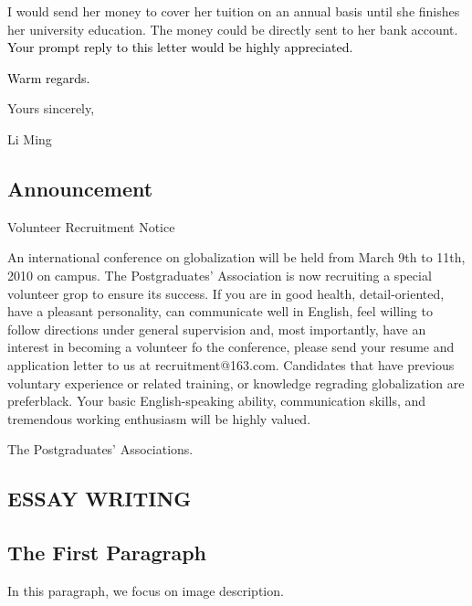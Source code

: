 \documentclass{article}
\makeatletter
\newcommand{\Rmnum}[1]{\expandafter\@slowromancap\romannumeral #1@}
\makeatother
\begin{document}
\par I would send her money to cover her tuition on an annual basis until she finishes her
university education. The money could be directly sent to her bank
account. \textcolor{black}{Your prompt reply to this letter would be highly appreciated.}

\par \textcolor{black}{Warm regards.}

\hfill Yours sincerely,

\hfill Li Ming

\subsection{Announcement}
\label{sec:letter}

\centerline{Volunteer Recruitment Notice}

\hspace{0.4cm} An international conference on globalization will be held from March 9th to 11th,
2010 on campus. The Postgraduates' Association is now recruiting a special volunteer grop
to ensure its success. If you are in good health, detail-oriented, have a pleasant
personality, can communicate well in English, feel willing to follow directions under
general supervision and, most importantly, have an interest in becoming a volunteer fo the
conference, please send your resume and application letter to us at
recruitment@163.com. Candidates that have previous voluntary experience or related
training, or knowledge regrading globalization are preferblack. Your basic English-speaking
ability, communication skills, and tremendous working enthusiasm will be highly valued.

\hfill The Postgraduates' Associations.

\begin{center}
  \section{ESSAY WRITING}
\end{center}

\label{sec:essay-writings}

\subsection{The First Paragraph}
\label{sec:first-paragraph}

In this paragraph, we focus on image description. 
\end{document}
